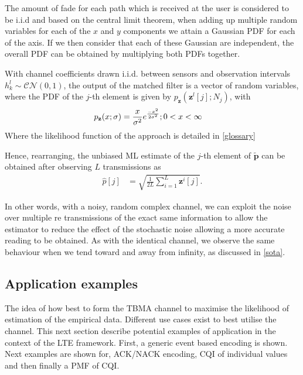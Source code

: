 \documentclass{article}
\begin{document}
The amount of fade for each path which is received at the user is considered to be i.i.d and based on the central limit theorem, when adding up multiple random variables for each of the $x$ and $y$ components we attain a Gaussian PDF for each of the axis. If we then consider that each of these Gaussian are independent, the overall PDF can be obtained by multiplying both PDFs together. 

With channel coefficients drawn \ac{i.i.d}. between sensors and observation intervals $h^l_k \sim \mathcal{CN}(0, 1)$, the output of the matched filter is a vector of random variables, where the \ac{PDF} of the $j$-th element is given by $p_{\mathbf{z}}(\boldsymbol{z}^l[j]; N_j)$, with  
%
\begin{align}
    p_{\mathbf{z}}(x; \sigma) &= \frac{x}{\sigma^2} e^{\frac{-x^2}{2\sigma^2}} ; 
    \newline 0 < x < \infty
\end{align} 
Where the likelihood function of the approach is detailed in \cref{glossary}

Hence, rearranging, the unbiased ML estimate of the $j$-th element of $\tilde{\boldsymbol{p}}$ can be obtained after observing $L$ transmissions as
%
\begin{align}
    \hat{p}[j] &= \sqrt{\frac{1}{2L} \sum_{i = 1}^{L}\boldsymbol{z}^i[j]}.\label{eq:empf_h_rand}
\end{align}

In other words, with a noisy, random complex channel, we can exploit the noise over multiple re transmissions of the exact same information to allow the estimator to reduce the effect of the stochastic noise allowing a more accurate reading to be obtained. As with the identical channel, we observe the same behaviour when we tend toward and away from infinity, as discussed in \cref{sota}.

\subsection{Application examples} \label{schemas_and_channels}
The idea of how best to form the TBMA channel to maximise the likelihood of estimation of the empirical data. Different use cases exist to best utilise the channel. This next section describe potential examples of application in the context of the LTE framework. First, a generic event based encoding is shown. Next examples are shown for, ACK/NACK encoding, \ac{CQI} of individual values and then finally a \ac{PMF} of \ac{CQI}.
\end{document}
